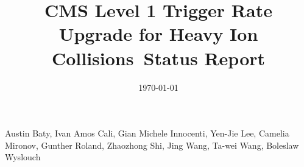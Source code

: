 \begin{titlepage}
\vspace{-.2 cm} 
\date{\today}
\vspace{2 cm}
\title{CMS Level 1 Trigger Rate Upgrade for Heavy Ion Collisions\ Status Report }

\vspace{.2 cm} 
\begin{Authlist}
Austin Baty\footnotemark[1], 
Ivan Amos Cali\footnotemark[1],
Gian Michele Innocenti\footnotemark[1], 
Yen-Jie Lee\footnotemark[1], 
Camelia Mironov\footnotemark[1], 
Gunther Roland\footnotemark[1], 
Zhaozhong Shi\footnotemark[1], 
Jing Wang\footnotemark[1], 
Ta-wei Wang\footnotemark[1], 
Boleslaw Wyslouch\footnotemark[1]
\end{Authlist}



\end{titlepage}





